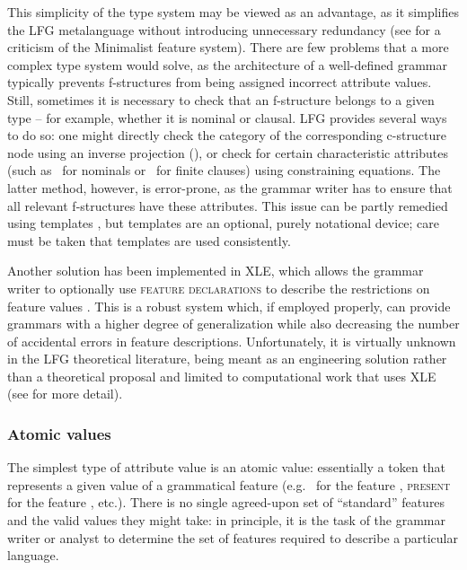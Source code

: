 \documentclass[output=paper,hidelinks]{langscibook}
\begin{document}
 This simplicity of the type system may be viewed as an advantage, as it simplifies the LFG metalanguage without introducing unnecessary redundancy (see \citealt[412ff.]{asudtoiv06} for a criticism of the Minimalist feature system). There are few problems that a more complex type system would solve, as the architecture of a well-defined grammar typically prevents f-structures from being assigned incorrect attribute values. Still, sometimes it is necessary to check that an f-structure belongs to a given type -- for example, whether it is nominal or clausal. LFG provides several ways to do so: one might directly check the category of the corresponding c-structure node using an inverse projection (), or check for certain characteristic attributes (such as \CASE\ for nominals or \TENSE\ for finite clauses) using constraining equations. The latter method, however, is error-prone, as the grammar writer has to ensure that all relevant f-structures have these attributes. This issue can be partly remedied using templates \parencite{asudeh2013constructions}, but templates are an optional, purely notational device; care must be taken that templates are used consistently.
 
 Another solution has been implemented in XLE, which allows the grammar writer to optionally use \textsc{feature declarations} to describe the restrictions on feature values \parencite{crouchking08}.  This is a robust system which, if employed properly, can provide grammars with a higher degree of generalization while also decreasing the number of accidental errors in feature descriptions. Unfortunately, it is virtually unknown in the LFG theoretical literature, being meant as an engineering solution rather than a theoretical proposal and limited to computational work that uses XLE (see  for more detail). 
 
 \subsubsection{Atomic values}

 The simplest type of attribute value is an atomic value: essentially a token that represents a given value of a grammatical feature (e.g. \ACC\ for the feature \CASE, \textsc{present} for the feature \TENSE, etc.). There is no single agreed-upon set of ``standard'' features and the valid values they might take: in principle, it is the task of the grammar writer or analyst to determine the set of features required to describe a particular language.
 
\end{document}
